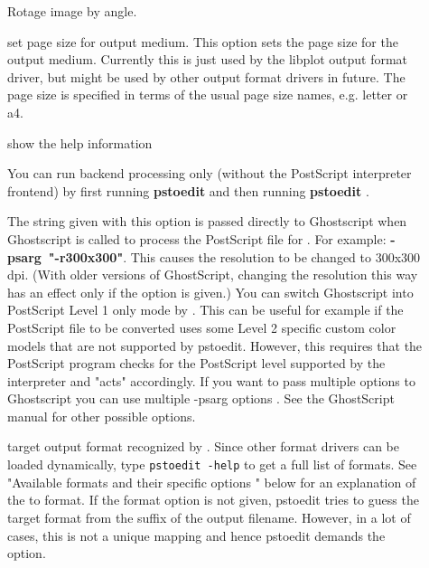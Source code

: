 \documentclass[english,a4paper]{article}
\begin{document}
\begin{description}
\item[] 
Rotage image by angle.


\item[] 
set page size for output medium.  
This option sets the page size for the output medium. Currently this is just used by the libplot output format driver, but might be used by other  output format drivers in future. The page size is specified in terms of the usual page size names, e.g. letter or a4. 


\item[] 
show the help information


\item[] 
You can run backend processing only (without the PostScript interpreter frontend) by first running \textbf{pstoedit}    and then running \textbf{pstoedit}     . 


\item[] 
The string given with this option is passed directly to Ghostscript when Ghostscript is called to process the PostScript file for . For example:      \textbf{-psarg}\textbf{~"}\textbf{-r300x300}\textbf{"}. This causes the resolution to be changed to 300x300 dpi. (With older versions of GhostScript, changing the resolution this way has an effect only if the  option is given.)   You can switch Ghostscript into PostScript Level 1 only mode by  . This can be useful for example if the PostScript file to be converted uses some Level 2 specific custom color models that are not supported by pstoedit. However, this requires that the PostScript program checks for the PostScript level supported by the interpreter and "acts" accordingly. If you want to pass multiple options to Ghostscript you can use multiple  -psarg options   . See the GhostScript manual for other possible options. 


\item[] 
target output format recognized by .  Since other format drivers can be loaded dynamically, type  \texttt{pstoedit -help} to get a full list of formats. See  "Available formats and their specific options " below for an explanation of the  to  format. If the format option is not given, pstoedit tries to guess the target format  from the suffix of the output filename. However, in a lot of cases, this is not a unique mapping and hence pstoedit demands the  option.



\end{description}
\end{document}
